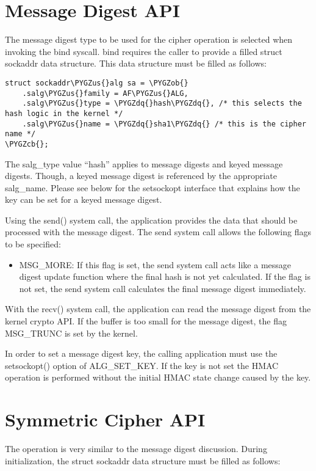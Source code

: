 \documentclass[a4paper,8pt,english]{sphinxmanual}
\def\PYGZus{\char`\_}
\def\PYGZob{\char`\{}
\def\PYGZcb{\char`\}}
\def\PYGZdq{\char`\"}
\begin{document}
\section{Message Digest API}
\label{crypto/userspace-if:message-digest-api}
The message digest type to be used for the cipher operation is selected
when invoking the bind syscall. bind requires the caller to provide a
filled struct sockaddr data structure. This data structure must be
filled as follows:

\begin{Verbatim}[commandchars=\\\{\}]
struct sockaddr\PYGZus{}alg sa = \PYGZob{}
    .salg\PYGZus{}family = AF\PYGZus{}ALG,
    .salg\PYGZus{}type = \PYGZdq{}hash\PYGZdq{}, /* this selects the hash logic in the kernel */
    .salg\PYGZus{}name = \PYGZdq{}sha1\PYGZdq{} /* this is the cipher name */
\PYGZcb{};
\end{Verbatim}

The salg\_type value ``hash'' applies to message digests and keyed message
digests. Though, a keyed message digest is referenced by the appropriate
salg\_name. Please see below for the setsockopt interface that explains
how the key can be set for a keyed message digest.

Using the send() system call, the application provides the data that
should be processed with the message digest. The send system call allows
the following flags to be specified:
\begin{itemize}
\item {} 
MSG\_MORE: If this flag is set, the send system call acts like a
message digest update function where the final hash is not yet
calculated. If the flag is not set, the send system call calculates
the final message digest immediately.

\end{itemize}

With the recv() system call, the application can read the message digest
from the kernel crypto API. If the buffer is too small for the message
digest, the flag MSG\_TRUNC is set by the kernel.

In order to set a message digest key, the calling application must use
the setsockopt() option of ALG\_SET\_KEY. If the key is not set the HMAC
operation is performed without the initial HMAC state change caused by
the key.


\section{Symmetric Cipher API}
\label{crypto/userspace-if:symmetric-cipher-api}
The operation is very similar to the message digest discussion. During
initialization, the struct sockaddr data structure must be filled as
follows:
\end{document}
